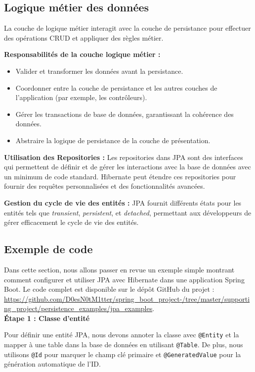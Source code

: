 \documentclass{article}
\begin{document}
\subsection{Logique métier des données}

La couche de logique métier interagit avec la couche de persistance pour effectuer des opérations CRUD et appliquer des règles métier.

\textbf{Responsabilités de la couche logique métier :}
\begin{itemize}
    \item Valider et transformer les données avant la persistance.
    \item Coordonner entre la couche de persistance et les autres couches de l'application (par exemple, les contrôleurs).
    \item Gérer les transactions de base de données, garantissant la cohérence des données.
    \item Abstraire la logique de persistance de la couche de présentation.
\end{itemize}

\textbf{Utilisation des Repositories :}
Les repositories dans JPA sont des interfaces qui permettent de définir et de gérer les interactions avec la base de données avec un minimum de code standard. Hibernate peut étendre ces repositories pour fournir des requêtes personnalisées et des fonctionnalités avancées.

\textbf{Gestion du cycle de vie des entités :}
JPA fournit différents états pour les entités tels que \textit{transient}, \textit{persistent}, et \textit{detached}, permettant aux développeurs de gérer efficacement le cycle de vie des entités.

\subsection{Exemple de code}
Dans cette section, nous allons passer en revue un exemple simple montrant comment configurer et utiliser JPA avec Hibernate dans une application Spring Boot. Le code complet est disponible sur le dépôt GitHub du projet :\\ \url{https://github.com/D0esN0tM1tter/spring_boot_project-/tree/master/supporting_project/persistence_examples/jpa_examples}.
\vspace{0.5cm}\\
\textbf{Étape 1 : Classe d'entité}

Pour définir une entité JPA, nous devons annoter la classe avec \texttt{@Entity} et la mapper à une table dans la base de données en utilisant \texttt{@Table}. De plus, nous utilisons \texttt{@Id} pour marquer le champ clé primaire et \texttt{@GeneratedValue} pour la génération automatique de l'ID.
\end{document}
